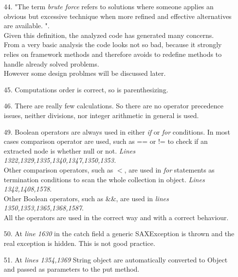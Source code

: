 \begin{itemize}
\item[44.] "The term \textit{brute force} refers to solutions where someone applies an obvious but excessive technique when more refined and effective alternatives are available. ". \\
Given this definition, the analyzed code has generated many concerns.\\
From a very basic analysis the code looks not so bad, because it strongly relies on framework methods and therefore avoids to redefine methods to handle already solved problems.\\
However some design problmes will be discussed later. 
\item[45.] Computations order is correct, so is parenthesizing.
\item[46.] There are really few calculations. So there are no operator precedence issues, neither divisions, nor integer arithmetic in general is used.
\item [49.] Boolean operators are always used in either \textit{if} or \textit{for} conditions. In most cases comparison operator are used, such as == or != to check if an extracted node is whether null or not. \textit{Lines 1322,1329,1335,1340,1347,1350,1353.}\\ Other comparison operators, such as $<$, are used in \textit{for} statements as termination conditions to scan the whole collection in object. \textit{Lines 1342,1408,1578}.\\Other Boolean operators, such as \&\&, are used in \textit{lines 1350,1353,1365,1368,1587}.\\ All the operators are used in the correct way and with a correct behaviour.
\item [50.] At \textit{line 1630} in the catch field a generic SAXException is thrown and the real exception is hidden. This is not good practice.
\item [51.] At \textit{lines 1354,1369} String object are automatically converted to Object and passed as parameters to the put method.

\end{itemize}
